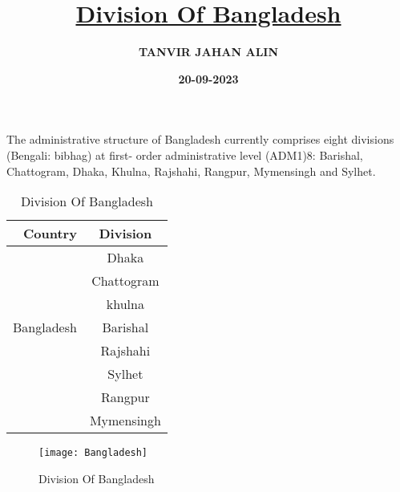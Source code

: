 \documentclass{article}
\title{\underline{\textbf{Division Of Bangladesh}}}
\date{\textbf{20-09-2023}}
\author{\textbf{TANVIR JAHAN ALIN}}
\begin{document}
\maketitle
The administrative structure of Bangladesh currently comprises eight divisions (Bengali: bibhag) at first- order administrative level (ADM1)8: Barishal, Chattogram, Dhaka, Khulna, Rajshahi, Rangpur, Mymensingh and Sylhet.

\begin{table}
\begin{center}
\begin{tabular} {|r|c|}
\hline
Country & Division \\
\hline
\cline{1-1}
& Dhaka \\
& Chattogram \\
& khulna \\
Bangladesh & Barishal \\
& Rajshahi \\
& Sylhet \\
& Rangpur \\ 
& Mymensingh \\
\hline


\end{tabular}

\caption{Division Of Bangladesh}

\end{center}
\end{table}

\begin{figure}[h]
\centering
\texttt{[image: Bangladesh]}
\caption{Division Of Bangladesh}

\end{figure}
\end{document}
